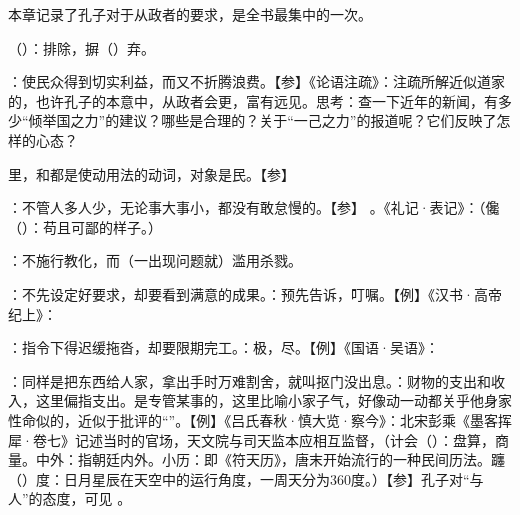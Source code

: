 {
本章记录了孔子对于从政者的要求，是全书最集中的一次。
\begin{lyitemize}
\item {}（）：排除，摒（）弃。
\item {}：使民众得到切实利益，而又不折腾浪费。【参】《论语注疏》：注疏所解近似道家的，也许孔子的本意中，从政者会更，富有远见。思考：查一下近年的新闻，有多少“倾举国之力”的建议？哪些是合理的？关于“一己之力”的报道呢？它们反映了怎样的心态？
\item {}里，和都是使动用法的动词，对象是民。【参】 
\item {}：不管人多人少，无论事大事小，都没有敢怠慢的。【参】 。《礼记·表记》：（儳（）：苟且可鄙的样子。）%
\item {}：不施行教化，而（一出现问题就）滥用杀戮。%
\item {}：不先设定好要求，却要看到满意的成果。：预先告诉，叮嘱。【例】《汉书·高帝纪上》：
\item {}：指令下得迟缓拖沓，却要限期完工。：极，尽。【例】《国语·吴语》：
\item {}：同样是把东西给人家，拿出手时万难割舍，就叫抠门没出息。：财物的支出和收入，这里偏指支出。是专管某事的，这里比喻小家子气，好像动一动都关乎他身家性命似的，近似于批评的“”。【例】《吕氏春秋·慎大览·察今》：北宋彭乘《墨客挥犀·卷七》记述当时的官场，天文院与司天监本应相互监督，（计会（）：盘算，商量。中外：指朝廷内外。小历：即《符天历》，唐末开始流行的一种民间历法。躔（）度：日月星辰在天空中的运行角度，一周天分为360度。）【参】孔子对“与人”的态度，可见  。

\end{lyitemize}}
